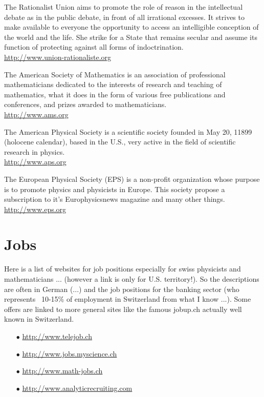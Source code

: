 		{\Large {}}{\Large {}}{\Large {}}\bcdfrance{} The Rationalist Union aims to promote the role of reason in the intellectual debate as in the public debate, in front of all irrational excesses. It strives to make available to everyone the opportunity to access an intelligible conception of the world and the life. She strike for a State that remains secular and assume its function of protecting against all forms of indoctrination.\\
		\href{http://www.union-rationaliste.org}{\color{blue}http://www.union-rationaliste.org}
		
		{\Large {}}{\Large {}} The American Society of Mathematics is an association of professional mathematicians dedicated to the interests of research and teaching of mathematics, what it does in the form of various free publications and conferences, and prizes awarded to mathematicians.\\
		\href{http://www.ams.org}{\color{blue}http://www.ams.org}
		
		{\Large {}}{\Large {}} The American Physical Society is a scientific society founded in May 20, 11899 (holocene calendar), based in the U.S., very active in the field of scientific research in physics.\\
		\href{http://www.aps.org}{\color{blue}http://www.aps.org}
		
		{\Large {}}{\Large {}}{\Large {}} The European Physical Society (EPS) is a non-profit organization whose purpose is to promote physics and physicists in Europe. This society propose a subscription to it's Europhysicsnews magazine and many other things.\\
		\href{http://www.eps.org}{\color{blue}http://www.eps.org}

	\pagebreak
	\section{Jobs}
	
	{\Large {}} Here is a list of websites for job positions especially for swiss physicists and mathematicians ... (however a link is only for U.S. territory!). So the descriptions are often in German (...) and the job positions for the banking sector (who represents ~10-15\% of employment in Switzerland from what I know ...). Some offers are linked to more general sites like the famous jobup.ch actually well known in Switzerland.
	
	\begin{itemize}	 
		\item[$\bullet$] \href{http://www.telejob.ch}{\color{blue}http://www.telejob.ch} 
	
		\item[$\bullet$] \href{http://www.jobs.myscience.ch}{\color{blue}http://www.jobs.myscience.ch}
	
		\item[$\bullet$] \href{http://www.math-jobs.ch}{\color{blue}http://www.math-jobs.ch}
	
		\item[$\bullet$] \href{http://www.analyticrecruiting.com}{\color{blue}http://www.analyticrecruiting.com}
	\end{itemize}
	
